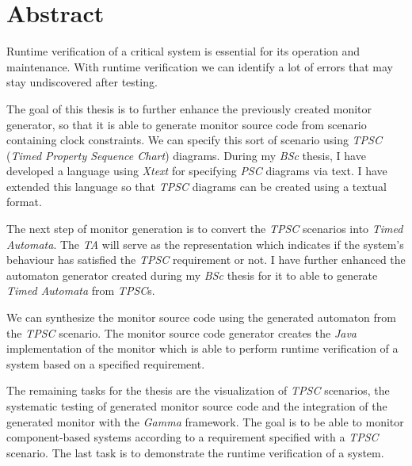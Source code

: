 \vfill
\selectenglish


\chapter*{Abstract}

Runtime verification of a critical system is essential for its operation and maintenance.
With runtime verification we can identify a lot of errors that may stay undiscovered after testing.

The goal of this thesis is to further enhance the previously created monitor generator, so that it is able to generate monitor source code from scenario containing clock constraints.
We can specify this sort of scenario using \textit{TPSC} (\textit{Timed Property Sequence Chart}) diagrams.
During my \textit{BSc} thesis, I have developed a language using \textit{Xtext} for specifying \textit{PSC} diagrams via text.
I have extended this language so that \textit{TPSC} diagrams can be created using a textual format.

The next step of monitor generation is to convert the \textit{TPSC} scenarios into \textit{Timed Automata}.
The \textit{TA} will serve as the representation which indicates if the system's behaviour has satisfied the \textit{TPSC} requirement or not.
I have further enhanced the automaton generator created during my \textit{BSc} thesis for it to able to generate \textit{Timed Automata} from \textit{TPSC}s.

We can synthesize the monitor source code using the generated automaton from the \textit{TPSC} scenario.
The monitor source code generator creates the \textit{Java} implementation of the monitor which is able to perform runtime verification of a system based on a specified requirement.

The remaining tasks for the thesis are the visualization of \textit{TPSC} scenarios, the systematic testing of generated monitor source code and the integration of the generated monitor with the \textit{Gamma} framework.
The goal is to be able to monitor component-based systems according to a requirement specified with a \textit{TPSC} scenario.
The last task is to demonstrate the runtime verification of a system.

\vfill
\selectthesislanguage

\setcounter{romanPage}{\value{page}}
